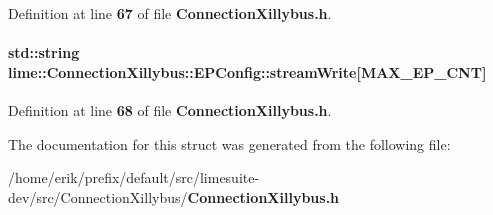 Definition at line {\bf 67} of file {\bf Connection\+Xillybus.\+h}.

\paragraph[{stream\+Write}]{\setlength{\rightskip}{0pt plus 5cm}std\+::string lime\+::\+Connection\+Xillybus\+::\+E\+P\+Config\+::stream\+Write[{\bf M\+A\+X\+\_\+\+E\+P\+\_\+\+C\+NT}]}\label{structlime_1_1ConnectionXillybus_1_1EPConfig_ac127e545f6bad7602e93a5838bfba9da}


Definition at line {\bf 68} of file {\bf Connection\+Xillybus.\+h}.



The documentation for this struct was generated from the following file\+:\begin{DoxyCompactItemize}
\item 
/home/erik/prefix/default/src/limesuite-\/dev/src/\+Connection\+Xillybus/{\bf Connection\+Xillybus.\+h}\end{DoxyCompactItemize}
